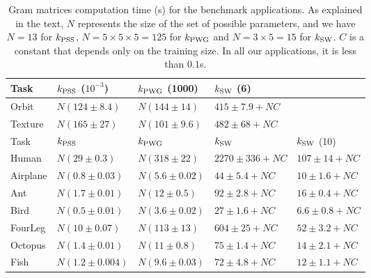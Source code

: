\begin{table}[t]
\vskip 0.15in
\begin{center}
\begin{small}
\begin{sc}
\begin{tabular}{|l|llll|}
\hline 
Task &         $k_{\rm PSS}$ ($10^{-3}$) &  $k_{\rm PWG}$ (1000) &    $k_{\rm SW}$ (6) &         \\
\hline 
Orbit &        $N(124\pm8.4)$ &       $N(144\pm14)$ &     $415\pm7.9+NC$ &                     \\        
Texture &      $N(165\pm27)$ &        $N(101\pm9.6)$ &    $482\pm68+NC$ &                      \\                                           
\hline 
Task &         $k_{\rm PSS}$ &              $k_{\rm PWG}$ &           $k_{\rm SW}$ &           $k_{\rm SW}$ (10) \\
\hline 
Human &        $N(29\pm0.3)$ &        $N(318\pm22)$ &     $2270\pm336+NC$ &  $107\pm14+NC$ \\
Airplane &     $N(0.8\pm0.03)$ &      $N(5.6\pm0.02)$ &   $44\pm5.4+NC$ &    $10\pm1.6+NC$ \\
Ant &          $N(1.7\pm0.01)$ &      $N(12\pm0.5)$ &     $92\pm2.8+NC$ &    $16\pm0.4+NC$ \\
Bird &         $N(0.5\pm0.01)$ &      $N(3.6\pm0.02)$ &   $27\pm1.6+NC$ &    $6.6\pm0.8+NC$ \\
FourLeg &      $N(10\pm0.07)$ &       $N(113\pm13)$ &     $604\pm25+NC$ &    $52\pm3.2+NC$ \\
Octopus &      $N(1.4\pm0.01)$ &      $N(11\pm0.8)$ &     $75\pm1.4+NC$ &    $14\pm2.1+NC$ \\
Fish &         $N(1.2\pm0.004)$ &     $N(9.6\pm0.03)$ &   $72\pm4.8+NC$ &    $12\pm1.1+NC$ \\
\hline                                                            
\end{tabular}

\end{sc}
\end{small}
\caption{\label{table:Gram} Gram matrices computation time (s) for the benchmark applications.
As explained in the text, $N$ represents the size of the set of possible parameters, and we have $N=13$ for $k_{\rm PSS}$, 
$N=5\times5\times5=125$ for $k_{\rm PWG}$ and $N=3\times5=15$ for $k_{\rm SW}$. $C$ is a constant that depends only on the
training size. In all our applications, it is less than $0.1$s.}
\end{center}
\vskip -0.1in
\end{table}

